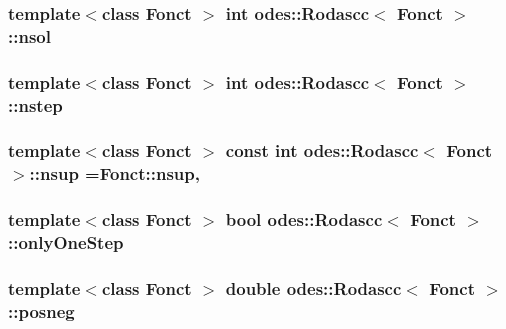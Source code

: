 \hypertarget{classodes_1_1Rodascc_a6c7de966dfd6d284946c4827d0772b53}{
\subsubsection[{nsol}]{\setlength{\rightskip}{0pt plus 5cm}template$<$class Fonct $>$ int {\bf odes\-::\-Rodascc}$<$ Fonct $>$\-::nsol\hspace{0.3cm}{\ttfamily [private]}}}\label{classodes_1_1Rodascc_a6c7de966dfd6d284946c4827d0772b53}
\hypertarget{classodes_1_1Rodascc_af85ccdddfcc356ca9cdf2f2520f79450}{
\subsubsection[{nstep}]{\setlength{\rightskip}{0pt plus 5cm}template$<$class Fonct $>$ int {\bf odes\-::\-Rodascc}$<$ Fonct $>$\-::nstep\hspace{0.3cm}{\ttfamily [private]}}}\label{classodes_1_1Rodascc_af85ccdddfcc356ca9cdf2f2520f79450}
\hypertarget{classodes_1_1Rodascc_a94122fb8af91d10037aa1206765cfcef}{
\subsubsection[{nsup}]{\setlength{\rightskip}{0pt plus 5cm}template$<$class Fonct $>$ const int {\bf odes\-::\-Rodascc}$<$ Fonct $>$\-::nsup =Fonct\-::nsup\hspace{0.3cm}{\ttfamily [static]}, {\ttfamily [private]}}}\label{classodes_1_1Rodascc_a94122fb8af91d10037aa1206765cfcef}
\hypertarget{classodes_1_1Rodascc_a6359fa4d0634a1090efe5a8d1c39eb10}{
\subsubsection[{only\-One\-Step}]{\setlength{\rightskip}{0pt plus 5cm}template$<$class Fonct $>$ bool {\bf odes\-::\-Rodascc}$<$ Fonct $>$\-::only\-One\-Step\hspace{0.3cm}{\ttfamily [private]}}}\label{classodes_1_1Rodascc_a6359fa4d0634a1090efe5a8d1c39eb10}
\hypertarget{classodes_1_1Rodascc_a6c0b8f4e3a7d5212199b653eb90fbb6e}{
\subsubsection[{posneg}]{\setlength{\rightskip}{0pt plus 5cm}template$<$class Fonct $>$ double {\bf odes\-::\-Rodascc}$<$ Fonct $>$\-::posneg\hspace{0.3cm}{\ttfamily [private]}}}\label{classodes_1_1Rodascc_a6c0b8f4e3a7d5212199b653eb90fbb6e}
